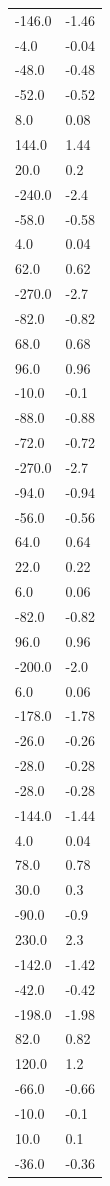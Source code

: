 \begin{longtable}{ll}
-146.0 & -1.46 \\
-4.0 & -0.04 \\
-48.0 & -0.48 \\
-52.0 & -0.52 \\
8.0 & 0.08 \\
144.0 & 1.44 \\
20.0 & 0.2 \\
-240.0 & -2.4 \\
-58.0 & -0.58 \\
4.0 & 0.04 \\
62.0 & 0.62 \\
-270.0 & -2.7 \\
-82.0 & -0.82 \\
68.0 & 0.68 \\
96.0 & 0.96 \\
-10.0 & -0.1 \\
-88.0 & -0.88 \\
-72.0 & -0.72 \\
-270.0 & -2.7 \\
-94.0 & -0.94 \\
-56.0 & -0.56 \\
64.0 & 0.64 \\
22.0 & 0.22 \\
6.0 & 0.06 \\
-82.0 & -0.82 \\
96.0 & 0.96 \\
-200.0 & -2.0 \\
6.0 & 0.06 \\
-178.0 & -1.78 \\
-26.0 & -0.26 \\
-28.0 & -0.28 \\
-28.0 & -0.28 \\
-144.0 & -1.44 \\
4.0 & 0.04 \\
78.0 & 0.78 \\
30.0 & 0.3 \\
-90.0 & -0.9 \\
230.0 & 2.3 \\
-142.0 & -1.42 \\
-42.0 & -0.42 \\
-198.0 & -1.98 \\
82.0 & 0.82 \\
120.0 & 1.2 \\
-66.0 & -0.66 \\
-10.0 & -0.1 \\
10.0 & 0.1 \\
-36.0 & -0.36 \\

\end{longtable}
